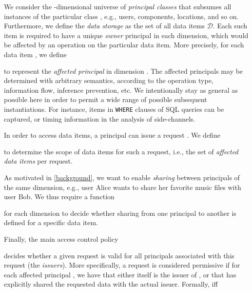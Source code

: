 \documentclass{src/acm_proc_article-sp} \else
\newcommand\cD{\ensuremath{\mathcal{D}}\xspace}
\begin{document}
We consider the -dimensional universe  of
\emph{principal classes}
 that subsumes all
instances of the particular class , e.g., users,
components, locations, and so on. Furthermore, we define the
\emph{data storage} as the set of all data items \cD. Each
such item is required to have a unique \emph{owner}
principal in each dimension, which would be affected by an
operation on the particular data item. More precisely, for
each data item , we define

to represent the \emph{affected principal} in dimension .
The affected principals may be determined with arbitrary
semantics, according to the operation type, information
flow, inference prevention, etc. We intentionally stay as
general as possible here in order to permit a wide range of
possible subsequent instantiations. For instance, items in
\texttt{WHERE} clauses of SQL queries can be captured, or
timing information in the analysis of side-channels.

In order to access data items, a principal can issue a
request . We define

to determine the scope of data items for such a request,
i.e., the set of \emph{affected data items} per request.

As motivated in \autoref{background}, we want to enable
\emph{sharing} between principals of the same dimension,
e.g., user Alice wants to share her favorite music files
with user Bob. We thus require a function

for each dimension 
to decide whether sharing from one principal to another is
defined for a specific data item.



Finally, the main access control policy

decides whether a given request is valid for all principals associated with
this request (the \emph{issuers}).
More specifically, a request  is considered permissive if for
each affected principal , we have that either 
itself is the issuer of , or that  has explicitly shared
the requested data with the actual issuer. Formally,
 iff
\end{document}
